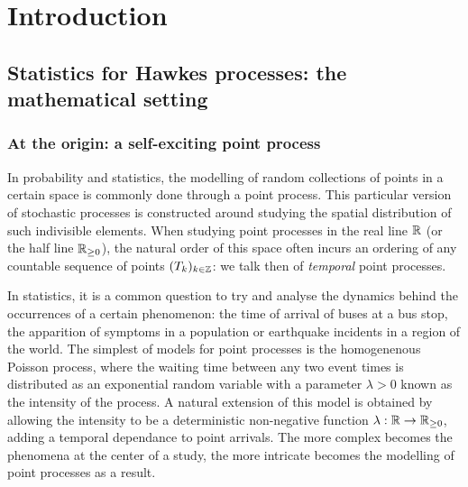 
\chapter{Introduction}

\section{Statistics for Hawkes processes: the mathematical setting}\label{sec:chap0_introduction}
    \subsection{At the origin: a self-exciting point process}
    In probability and statistics, the modelling of random collections of points in a certain space is commonly done through a point process.
    This particular version of stochastic processes is constructed around studying the spatial distribution of such indivisible elements.
    When studying point processes in the real line ${\mathbb R}$ (or the half line ${\mathbb R}_{\geq 0}$), the natural order of this space often incurs an ordering of any countable sequence of points $(T_k)_{k\in{\mathbb Z}}$: we talk then of \emph{temporal} point processes.

    In statistics, it is a common question to try and analyse the dynamics behind the occurrences of a certain phenomenon: the time of arrival of buses at a bus stop, the apparition of symptoms in a population or earthquake incidents in a region of the world.
    The simplest of models for point processes is the homogenenous Poisson process, where the waiting time between any two event times is distributed as an exponential random variable with a parameter $\lambda > 0$ known as the intensity of the process.
    A natural extension of this model is obtained by allowing the intensity to be a deterministic non-negative function $\lambda:{\mathbb R} \to {\mathbb R}_{\geq0}$, adding a temporal dependance to point arrivals.
    The more complex becomes the phenomena at the center of a study, the more intricate becomes the modelling of point processes as a result. 


